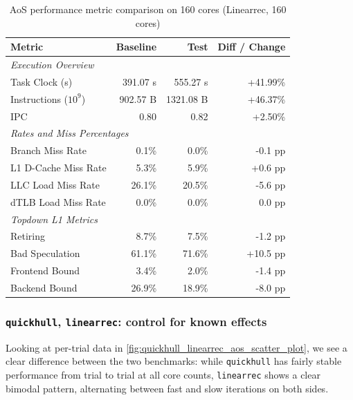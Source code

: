 \documentclass[leqno,11pt]{article}
\begin{document}
    \begin{table}[htbp]
      \centering
      \caption{AoS performance metric comparison on 160 cores (Linearrec, 160 cores)}
      \label{tab:perf_comparison_aos_linearrec_160cores}
      \begin{tabular}{lrrr}
        \toprule
        \textbf{Metric} & \textbf{Baseline} & \textbf{Test} & \textbf{Diff / Change} \\
        \midrule
        \multicolumn{4}{l}{\textit{Execution Overview}} \\
        \quad Task Clock (s)           & 391.07 s   & 555.27 s   & +41.99\%   \\
        \quad Instructions ($10^9$)    & 902.57 B  & 1321.08 B  & +46.37\%   \\
        \quad IPC                      & 0.80       & 0.82       & +2.50\%    \\
        \midrule
        \multicolumn{4}{l}{\textit{Rates and Miss Percentages}} \\
        \quad Branch Miss Rate         & 0.1\%      & 0.0\%      & -0.1 pp    \\
        \quad L1 D-Cache Miss Rate     & 5.3\%      & 5.9\%      & +0.6 pp    \\
        \quad LLC Load Miss Rate       & 26.1\%     & 20.5\%     & -5.6 pp    \\
        \quad dTLB Load Miss Rate      & 0.0\%      & 0.0\%      & 0.0 pp     \\
        \midrule
        \multicolumn{4}{l}{\textit{Topdown L1 Metrics}} \\
        \quad Retiring                 & 8.7\%      & 7.5\%      & -1.2 pp    \\
        \quad Bad Speculation          & 61.1\%     & 71.6\%     & +10.5 pp   \\
        \quad Frontend Bound           & 3.4\%      & 2.0\%      & -1.4 pp    \\
        \quad Backend Bound            & 26.9\%      & 18.9\%      & -8.0 pp    \\
        \bottomrule
      \end{tabular}
    \end{table}

\subsubsection{\texttt{quickhull}, \texttt{linearrec}: control for known effects}
Looking at per-trial data in \cref{fig:quickhull_linearrec_aos_scatter_plot}, we
see a clear difference between the two benchmarks: while \texttt{quickhull} has
fairly stable performance from trial to trial at all core counts,
\texttt{linearrec} shows a clear bimodal pattern, alternating between fast and
slow iterations on both sides.
\end{document}
